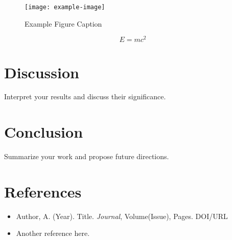 \documentclass[a4paper,12pt]{article}
\begin{document}
\begin{figure}[h!]
    \centering
    \texttt{[image: example-image]}
    \caption{Example Figure Caption}
    \label{fig:example}
\end{figure}

\begin{equation}
    E = mc^2
\end{equation}

\section{Discussion}
Interpret your results and discuss their significance.

\section{Conclusion}
Summarize your work and propose future directions.

\section*{References}
\begin{itemize}
    \item Author, A. (Year). Title. \textit{Journal}, Volume(Issue), Pages. DOI/URL
    \item Another reference here.
\end{itemize}
\end{document}
